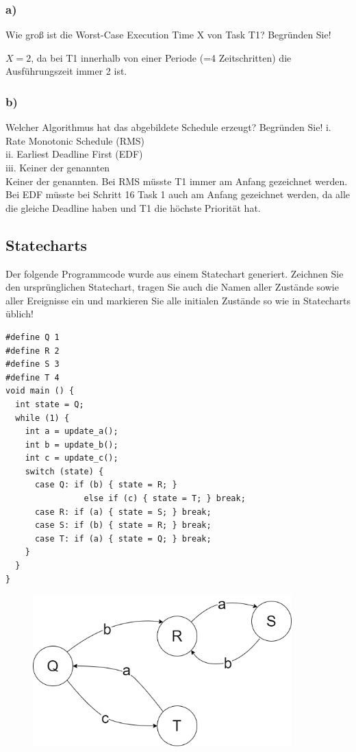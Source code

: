 \subsubsection{a)}
Wie groß ist die Worst-Case Execution Time X von Task T1? Begründen Sie!

$X=2$, da bei T1 innerhalb von einer Periode (=4 Zeitschritten) die Ausführungszeit immer 2 ist.

\subsubsection{b)}
Welcher Algorithmus hat das abgebildete Schedule erzeugt? Begründen Sie!
i. Rate Monotonic Schedule (RMS)\\
ii. Earliest Deadline First (EDF)\\
iii. Keiner der genannten\\

Keiner der genannten. Bei RMS müsste T1 immer am Anfang gezeichnet werden. Bei EDF müsste bei Schritt 16 Task 1 auch am 
Anfang gezeichnet werden, da alle die gleiche Deadline haben und T1 die höchste Priorität hat.

\subsection{Statecharts}
Der folgende Programmcode wurde aus einem Statechart generiert. Zeichnen Sie den ursprünglichen
Statechart, tragen Sie auch die Namen aller Zustände sowie aller Ereignisse ein und markieren Sie alle
initialen Zustände so wie in Statecharts üblich!

\begin{lstlisting}
#define Q 1
#define R 2
#define S 3
#define T 4
void main () {
  int state = Q;
  while (1) {
    int a = update_a();
    int b = update_b();
    int c = update_c();
    switch (state) {
      case Q: if (b) { state = R; }
                else if (c) { state = T; } break;
      case R: if (a) { state = S; } break;
      case S: if (b) { state = R; } break;
      case T: if (a) { state = Q; } break;
    }
  }
}
\end{lstlisting}

\begin{figure}[H]
  \includegraphics[width=10cm]{images/KA280521/5a.PNG}
  \centering
\end{figure}

